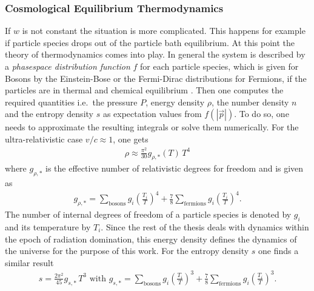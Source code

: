 \documentclass[twoside,a4paper, 12pt]{article}
\newcommand{\diff}{\mathrm{d}}
\numberwithin{equation}{section}
\begin{document}
\subsubsection{Cosmological Equilibrium Thermodynamics}
If $w$ is not constant the situation is more complicated. This happens for example if
particle species drops out of the particle bath  equilibrium.
At this point the theory of thermodynamics comes into play. In general the system is described by a \emph{phasespace distribution function} $f$ for each particle species, which is given for Bosons by the
Einstein-Bose or the Fermi-Dirac distributions for Fermions, if
the particles are in thermal and chemical equilibrium \cite[Sec. 3.3]{TheEarlyUniverseKolbAndTurner}. Then one computes
the required quantities i.e.\ the pressure $P$, energy density $\rho$, the number density $n$ and the entropy density $s$ as expectation values
from $f(|\vec{p}|)$. To do so, one needs to approximate the resulting integrals or solve them numerically. For the ultra-relativistic case $v/c \approx 1$, one gets \cite[Eq. 3.51, 3.52, 3.59, 3.61, 3.62] {TheEarlyUniverseKolbAndTurner}
\begin{align}
    \label{eq:energy_denstiy}
    \rho \approx \frac{\pi^2}{30} g_{\rho, *}(T) \, T^4
\end{align}
where $g_{\rho, *}$ is the effective number of relativistic degrees for freedom and is given as
\begin{align}
    \label{eq:g_rho}
    g_{\rho, *} = \sum_\mathrm{bosons} g_i \left( \frac{T_i}{T} \right)^4 + \frac{7}{8} \sum_\mathrm{fermions} g_i \left( \frac{T_i}{T} \right)^4.
\end{align}
The number of internal degrees of freedom of a particle species is denoted by $g_i$ and its temperature by $T_i$. 
Since the rest of the thesis deals with dynamics within the epoch of radiation domination, this energy density defines the
dynamics of the universe for the purpose of this work.
For the entropy density $s$ one finds a similar result \cite[Eq. 3.72, 3.73]{TheEarlyUniverseKolbAndTurner}
\begin{align}
    \label{eq:entropy_density}
     s = \frac{2 \pi^2}{45} g_{s, *} \, T^3 \, \, \mathrm{with} \, \,
     g_{s, *} = \sum_\mathrm{bosons} g_i \left( \frac{T_i}{T} \right)^3 + \frac{7}{8} \sum_\mathrm{fermions} g_i \left( \frac{T_i}{T} \right)^3.
\end{align}
\end{document}
